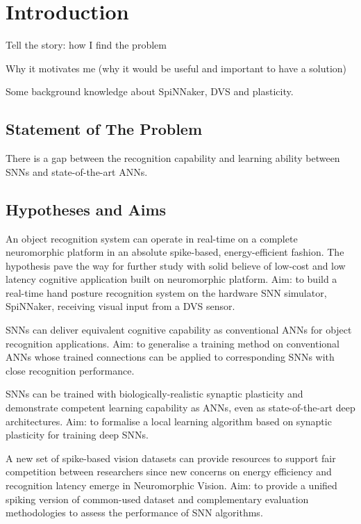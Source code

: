 \chapter{Introduction}
\label{cha:intro}

Tell the story: how I find the problem

Why it motivates me (why it would be useful and important to have a solution)

Some background knowledge about SpiNNaker, DVS and plasticity.


\section{Statement of The Problem}
\label{sec:problem}
There is a gap between the recognition capability and learning ability between SNNs and state-of-the-art ANNs. %


\section{Hypotheses and Aims}
\label{sec:aim}
An object recognition system can operate in real-time on a complete neuromorphic platform in an absolute spike-based, energy-efficient fashion.
The hypothesis pave the way for further study with solid believe of low-cost and low latency cognitive application built on neuromorphic platform.
Aim: to build a real-time hand posture recognition system on the hardware SNN simulator, SpiNNaker, receiving visual input from a DVS sensor.

SNNs can deliver equivalent cognitive capability as conventional ANNs for object recognition applications.
Aim: to generalise a training method on conventional ANNs whose trained connections can be applied to corresponding SNNs with close recognition performance.

SNNs can be trained with biologically-realistic synaptic plasticity and demonstrate competent learning capability as ANNs, even as state-of-the-art deep architectures.
Aim: to formalise a local learning algorithm based on synaptic plasticity for training deep SNNs.

A new set of spike-based vision datasets can provide resources to support fair competition between researchers since new concerns on energy efficiency and recognition latency emerge in Neuromorphic Vision.
Aim: to provide a unified spiking version of common-used dataset and complementary evaluation methodologies to assess the performance of SNN algorithms.




